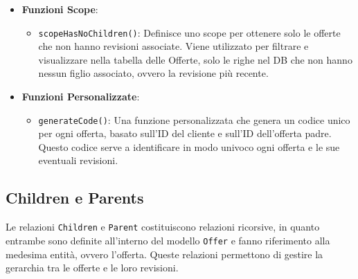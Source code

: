 \begin{itemize}
\begin{itemize}
        \item \texttt{referents()}: Definisce la relazione \texttt{BelongsTo} con il modello\\
        \texttt{Referent}. Indica quali referenti sono associati all'offerta, permettendo di accedere ai contatti all'interno dell'azienda cliente direttamente tramite l'offerta. Approfondiremo l'argomento nel capitolo \ref{sec:cap_sec_subsec_referenti}.
        
        \item \texttt{parentOffer()}: Definisce la relazione \texttt{BelongsTo} con l'offerta padre. Questa relazione è utile per gestire le offerte che sono delle revisioni o delle varianti di un'offerta precedente.
        
        \item \texttt{childrenOffer()}: Definisce la relazione \texttt{HasMany} per gestire tutte le revisioni di un'offerta. Le offerte figlie sono visualizzate in tabella al posto dell'offerta padre una volta che vengono create.
    \end{itemize}
    

    \item \textbf{Funzioni Scope}:
    \begin{itemize}
        \item \texttt{scopeHasNoChildren()}: Definisce uno scope per ottenere solo le offerte che non hanno revisioni associate. Viene utilizzato per filtrare e visualizzare nella tabella delle Offerte, solo le righe nel DB che non hanno nessun figlio associato, ovvero la revisione più recente.
    \end{itemize}

    \item \textbf{Funzioni Personalizzate}:
    \begin{itemize}
        \item \texttt{generateCode()}: Una funzione personalizzata che genera un codice unico per ogni offerta, basato sull'ID del cliente e sull'ID dell'offerta padre. Questo codice serve a identificare in modo univoco ogni offerta e le sue eventuali revisioni.
    \end{itemize}
\end{itemize}

\subsection{Children e Parents}\label{sec:cap_sec_subsec_children_parents}
Le relazioni \texttt{Children} e \texttt{Parent}  costituiscono relazioni ricorsive, in quanto entrambe sono definite all’interno del modello \texttt{Offer} e fanno riferimento alla medesima entità, ovvero l’offerta. Queste relazioni permettono di gestire la gerarchia tra le offerte e le loro revisioni.

